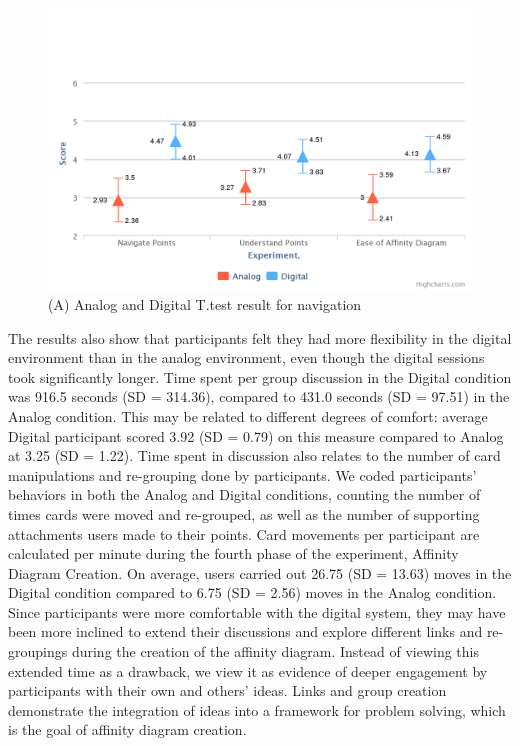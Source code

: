 \documentclass{sigchi}
\begin{document}
\begin{figure}[!h]
\centering
\includegraphics[width=1.0\columnwidth]{navigate}
\caption{(A) Analog and Digital T.test result for navigation}
\label{fig:figure1}
\end{figure}

The results also show that participants felt they had more flexibility in the digital environment than in the analog environment, even though the digital sessions took significantly longer. Time spent per group discussion in the Digital condition was 916.5 seconds (SD = 314.36), compared to 431.0 seconds (SD = 97.51) in the Analog condition. This may be related to different degrees of comfort: average Digital participant scored 3.92 (SD = 0.79) on this measure compared to Analog at 3.25 (SD = 1.22). Time spent in discussion also relates to the number of card manipulations and re-grouping done by participants. We coded participants' behaviors in both the Analog and Digital conditions, counting the number of times cards were moved and re-grouped, as well as the number of supporting attachments users made to their points. Card movements per participant are calculated per minute during the fourth phase of the experiment, Affinity Diagram Creation. On average, users carried out 26.75 (SD = 13.63) moves in the Digital condition compared to 6.75 (SD = 2.56) moves in the Analog condition. Since participants were more comfortable with the digital system, they may have been more inclined to extend their discussions and explore different links and re-groupings during the creation of the affinity diagram. Instead of viewing this extended time as a drawback, we view it as evidence of deeper engagement by participants with their own and others' ideas. Links and group creation demonstrate the integration of ideas into a framework for problem solving, which is the goal of affinity diagram creation. 
\end{document}

